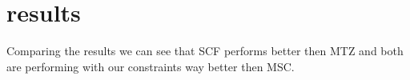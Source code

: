 \section{results}

Comparing the results we can see that SCF performs better then MTZ and both are performing with our constraints way better then MSC.
